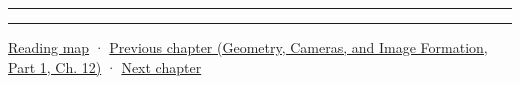 \begin{center}\rule{0.5\linewidth}{0.5pt}\end{center}

\begin{center}\rule{0.5\linewidth}{0.5pt}\end{center}

\hyperref[volume-reading-map]{Reading map} · \href{../03-Geometry-Cameras-and-Image-Formation-P01/main.pdf\#nameddest=03-visual-computing-i-ch013-from-view-space-to-clip-space}{Previous chapter (Geometry, Cameras, and Image Formation, Part 1, Ch. 12)} · \hyperref[03-visual-computing-i-ch015-rasterization-foundations-and-renderer-evidence]{Next chapter}
